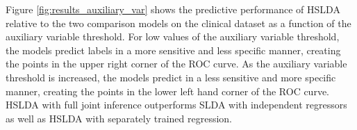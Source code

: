 Figure \ref{fig:results_auxiliary_var} shows the predictive performance of HSLDA 
relative to the two comparison models on the clinical dataset as a function of the auxiliary variable threshold. 
For low values of the auxiliary variable threshold, the models predict labels
in a more sensitive and less specific manner, creating the points in the upper
right corner of the ROC curve. As the auxiliary variable threshold is
increased, the models predict in a less sensitive and more specific manner,
creating the points in the lower left hand corner of the ROC curve. HSLDA with full joint inference outperforms SLDA with
independent regressors as well as HSLDA with separately trained
regression. 

